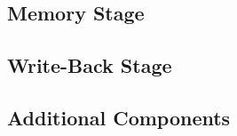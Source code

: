 \newpage
\subsection{Memory Stage}
    

\newpage
\subsection{Write-Back Stage}
    

\newpage
\subsection{Additional Components}
    

